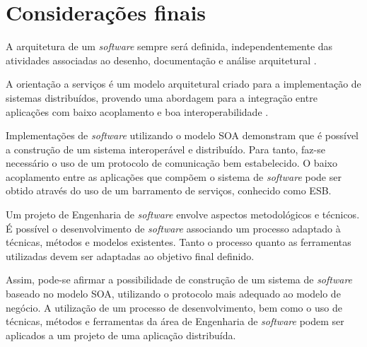 \section{Considerações finais}

A arquitetura de um \textit{software} sempre será definida, independentemente das atividades associadas ao desenho, documentação e análise arquitetural \cite{bass_software_archi_practice_2003}.

A orientação a serviços é um modelo arquitetural criado para a implementação de sistemas distribuídos, provendo uma abordagem para a integração entre aplicações com baixo acoplamento e boa interoperabilidade \cite{linthicum_soainrealworld_2007}.

Implementações de \textit{software} utilizando o modelo SOA demonstram que é possível a construção de um sistema interoperável e distribuído. Para tanto, faz-se necessário o uso de um protocolo de comunicação bem estabelecido. O baixo acoplamento entre as aplicações que compõem o sistema de \textit{software} pode ser obtido através do uso de um barramento de serviços, conhecido como ESB.

Um projeto de Engenharia de \textit{software} envolve aspectos metodológicos e técnicos. É possível o desenvolvimento de \textit{software} associando um processo adaptado à técnicas, métodos e modelos existentes. Tanto o processo quanto as ferramentas utilizadas devem ser adaptadas ao objetivo final definido.

Assim, pode-se afirmar a possibilidade de construção de um sistema de \textit{software} baseado no modelo SOA, utilizando o protocolo mais adequado ao modelo de negócio. A utilização de um processo de desenvolvimento, bem como o uso de técnicas, métodos e ferramentas da área de Engenharia de \textit{software} podem ser aplicados a um projeto de uma aplicação distribuída.